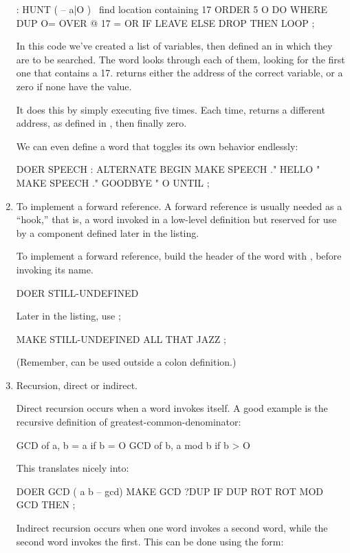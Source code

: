 \begin{enumerate}
\begin{Code}
: HUNT  ( -- a|O )  \  find location containing 17
   ORDER  5 O DO  WHERE  DUP O=  OVER @  17 =  OR  IF
      LEAVE  ELSE  DROP  THEN  LOOP ;
\end{Code}
In this code we've created a list of variables, then defined an
 in which they are to be searched. The word 
looks through each of them, looking for the first one that contains a 17.
 returns either the address of the correct variable, or a zero
if none have the value.

It does this by simply executing  five times. Each time,
 returns a different address, as defined in ,
then finally zero.

We can even define a  word that toggles its own behavior
endlessly:

\begin{Code}
DOER SPEECH
: ALTERNATE
   BEGIN  MAKE SPEECH ." HELLO "
   MAKE SPEECH ." GOODBYE "
   O UNTIL ;
\end{Code}
\item To implement a forward reference. A forward reference is usually
needed as a ``hook,'' that is, a word invoked in a low-level definition
but reserved for use by a component defined later in the listing.

To implement a forward reference, build the header of the word with
, before invoking its name.

\begin{Code}
DOER STILL-UNDEFINED
\end{Code}
Later in the listing, use ;

\begin{Code}
MAKE STILL-UNDEFINED  ALL THAT JAZZ ;
\end{Code}
(Remember,  can be used outside a colon definition.)

\item Recursion, direct or indirect.

Direct recursion occurs when a word invokes itself. A good example is the
recursive definition of greatest-common-denominator:

\begin{Code}
GCD of a, b =  a                     if b = O
               GCD of b, a mod b     if b > O
\end{Code}
This translates nicely into:

\begin{Code}
DOER GCD ( a b -- gcd)
MAKE GCD  ?DUP  IF  DUP ROT ROT  MOD  GCD  THEN ;
\end{Code}
Indirect recursion occurs when one word invokes a second word, while the
second word invokes the first. This can be done using the form:


\end{enumerate}
